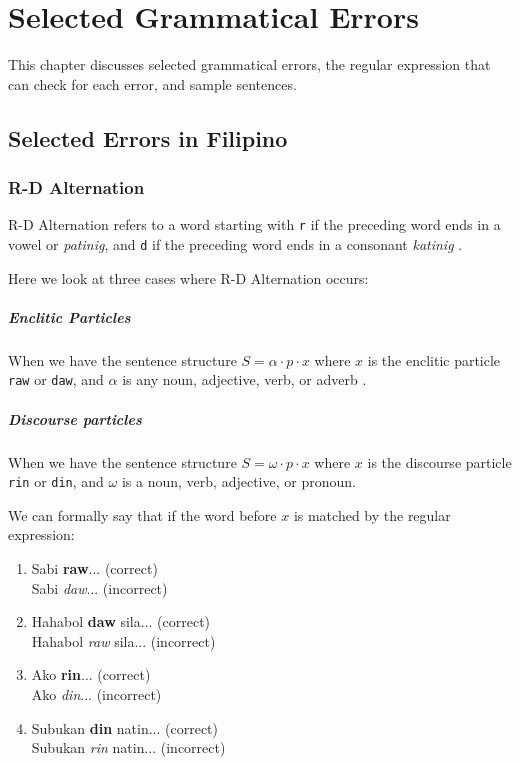\chapter{Selected Grammatical Errors}
\label{errors}

This chapter discusses selected grammatical errors, the regular expression that can check for each error, and sample sentences.

\section{Selected Errors in Filipino}
\subsection{R-D Alternation}
\label{rd_alternation}

R-D Alternation refers to a word starting with \texttt{r} if the preceding word ends in a vowel or \textit{patinig}, and \texttt{d} if the preceding word ends in a consonant \textit{katinig} \cite{KWF, OOP}. 

Here we look at three cases where R-D Alternation occurs:

\paragraph{Enclitic Particles} When we have the sentence structure \(S = \alpha \cdot p \cdot x\) where $x$ is the enclitic particle \texttt{raw} or \texttt{daw}, and \(\alpha\) is any noun, adjective, verb, or adverb \cite{KWF}. 

\paragraph{Discourse particles} When we have the sentence structure $S = \omega \cdot p \cdot x$ where $x$ is the discourse particle \texttt{rin} or \texttt{din}, and $\omega$ is a noun, verb, adjective, or pronoun.

We can formally say that if the word before $x$ is matched by the regular expression:

\begin{example}
\end{example}

\begin{enumerate}
    \item Sabi \textbf{raw}... (correct)
        \\ Sabi \textit{daw}... (incorrect)
    \item Hahabol \textbf{daw} sila... (correct)
        \\ Hahabol \textit{raw} sila... (incorrect)
    \item Ako \textbf{rin}... (correct)
        \\ Ako \textit{din}... (incorrect)
    \item Subukan \textbf{din} natin... (correct)
        \\ Subukan \textit{rin} natin... (incorrect)
\end{enumerate}

